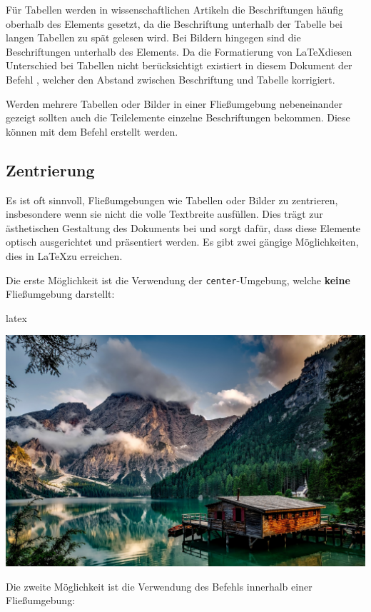 Für Tabellen werden in wissenschaftlichen Artikeln die Beschriftungen häufig oberhalb des Elements gesetzt, da die Beschriftung unterhalb der Tabelle bei langen Tabellen zu spät gelesen wird. Bei Bildern hingegen sind die Beschriftungen unterhalb des Elements. Da die Formatierung von \LaTeX diesen Unterschied bei Tabellen nicht berücksichtigt existiert in diesem Dokument der Befehl \texttt{\captionabove{}}, welcher den Abstand zwischen Beschriftung und Tabelle korrigiert.

Werden mehrere Tabellen oder Bilder in einer Fließumgebung nebeneinander gezeigt sollten auch die Teilelemente einzelne Beschriftungen bekommen. Diese können mit dem Befehl \texttt{\subcaption{}} erstellt werden.

\subsection{Zentrierung}
Es ist oft sinnvoll, Fließumgebungen wie Tabellen oder Bilder zu zentrieren, insbesondere wenn sie nicht die volle Textbreite ausfüllen. Dies trägt zur ästhetischen Gestaltung des Dokuments bei und sorgt dafür, dass diese Elemente optisch ausgerichtet und präsentiert werden. Es gibt zwei gängige Möglichkeiten, dies in \LaTeX zu erreichen.

Die erste Möglichkeit ist die Verwendung der \texttt{center}-Umgebung, welche \textbf{keine} Fließumgebung darstellt:

\begin{showcode}{latex}
    \begin{center}
        \includegraphics[width=0.4\columnwidth]{assets/images/bilder/pexels-pixabay-147411.jpg}
    \end{center}
\end{showcode}

Die zweite Möglichkeit ist die Verwendung des Befehls \texttt{\centering} innerhalb einer Fließumgebung:

